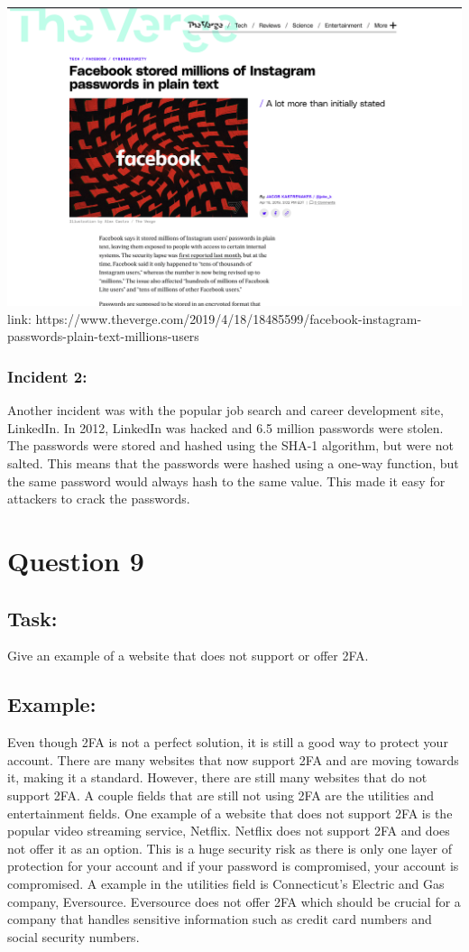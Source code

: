 \documentclass{article}
\begin{document}
\begin{center}
    \includegraphics[scale=.22]{images/verge_source.png}
    link: https://www.theverge.com/2019/4/18/18485599/facebook-instagram-passwords-plain-text-millions-users
\end{center}

\subsubsection*{Incident 2:}
Another incident was with the popular job search and career development site, LinkedIn. 
In 2012, LinkedIn was hacked and 6.5 million passwords were stolen. The passwords were stored
and hashed using the SHA-1 algorithm, but were not salted. This means that the passwords were
hashed using a one-way function, but the same password would always hash to the same value.
This made it easy for attackers to crack the passwords. 

\section{Question 9}
\subsection*{Task:} Give an example of a website that does not support or offer 2FA.

\subsection*{Example:}
Even though 2FA is not a perfect solution, it is still a good way to protect your account. 
There are many websites that now support 2FA and are moving towards it, making it a standard.
However, there are still many websites that do not support 2FA. A couple fields that are still
not using 2FA are the utilities and entertainment fields. One example of a website that does
not support 2FA is the popular video streaming service, Netflix. Netflix does not support 2FA
and does not offer it as an option. This is a huge security risk as there is only one layer of
protection for your account and if your password is compromised, your account is compromised.
A example in the utilities field is Connecticut's Electric and Gas company, Eversource. Eversource
does not offer 2FA which should be crucial for a company that handles sensitive information
such as credit card numbers and social security numbers. 
\end{document}
